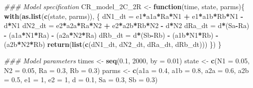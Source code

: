 \documentclass[
]{book}
\newenvironment{Shaded}{\begin{snugshade}}{\end{snugshade}}
\newcommand{\CommentTok}[1]{\textcolor[rgb]{0.56,0.35,0.01}{\textit{#1}}}
\newcommand{\ControlFlowTok}[1]{\textcolor[rgb]{0.13,0.29,0.53}{\textbf{#1}}}
\newcommand{\DataTypeTok}[1]{\textcolor[rgb]{0.13,0.29,0.53}{#1}}
\newcommand{\DecValTok}[1]{\textcolor[rgb]{0.00,0.00,0.81}{#1}}
\newcommand{\FloatTok}[1]{\textcolor[rgb]{0.00,0.00,0.81}{#1}}
\newcommand{\KeywordTok}[1]{\textcolor[rgb]{0.13,0.29,0.53}{\textbf{#1}}}
\newcommand{\NormalTok}[1]{#1}
\newcommand{\OperatorTok}[1]{\textcolor[rgb]{0.81,0.36,0.00}{\textbf{#1}}}
\newcommand{\StringTok}[1]{\textcolor[rgb]{0.31,0.60,0.02}{#1}}
\begin{document}
\begin{Shaded}
\begin{Highlighting}[]
\CommentTok{### Model specification}
\NormalTok{CR_model_2C_2R <-}\StringTok{ }\ControlFlowTok{function}\NormalTok{(time, state, parms)\{}
  \KeywordTok{with}\NormalTok{(}\KeywordTok{as.list}\NormalTok{(}\KeywordTok{c}\NormalTok{(state, parms)), \{}
\NormalTok{    dN1_dt =}\StringTok{ }\NormalTok{e1}\OperatorTok{*}\NormalTok{a1a}\OperatorTok{*}\NormalTok{Ra}\OperatorTok{*}\NormalTok{N1 }\OperatorTok{+}\StringTok{ }\NormalTok{e1}\OperatorTok{*}\NormalTok{a1b}\OperatorTok{*}\NormalTok{Rb}\OperatorTok{*}\NormalTok{N1 }\OperatorTok{-}\StringTok{ }\NormalTok{d}\OperatorTok{*}\NormalTok{N1}
\NormalTok{    dN2_dt =}\StringTok{ }\NormalTok{e2}\OperatorTok{*}\NormalTok{a2a}\OperatorTok{*}\NormalTok{Ra}\OperatorTok{*}\NormalTok{N2 }\OperatorTok{+}\StringTok{ }\NormalTok{e2}\OperatorTok{*}\NormalTok{a2b}\OperatorTok{*}\NormalTok{Rb}\OperatorTok{*}\NormalTok{N2 }\OperatorTok{-}\StringTok{ }\NormalTok{d}\OperatorTok{*}\NormalTok{N2}
\NormalTok{    dRa_dt =}\StringTok{ }\NormalTok{d}\OperatorTok{*}\NormalTok{(Sa}\OperatorTok{-}\NormalTok{Ra) }\OperatorTok{-}\StringTok{ }\NormalTok{(a1a}\OperatorTok{*}\NormalTok{N1}\OperatorTok{*}\NormalTok{Ra) }\OperatorTok{-}\StringTok{ }\NormalTok{(a2a}\OperatorTok{*}\NormalTok{N2}\OperatorTok{*}\NormalTok{Ra) }
\NormalTok{    dRb_dt =}\StringTok{ }\NormalTok{d}\OperatorTok{*}\NormalTok{(Sb}\OperatorTok{-}\NormalTok{Rb) }\OperatorTok{-}\StringTok{ }\NormalTok{(a1b}\OperatorTok{*}\NormalTok{N1}\OperatorTok{*}\NormalTok{Rb) }\OperatorTok{-}\StringTok{ }\NormalTok{(a2b}\OperatorTok{*}\NormalTok{N2}\OperatorTok{*}\NormalTok{Rb)}
    \KeywordTok{return}\NormalTok{(}\KeywordTok{list}\NormalTok{(}\KeywordTok{c}\NormalTok{(dN1_dt, dN2_dt, dRa_dt, dRb_dt)))}
\NormalTok{  \})}
\NormalTok{\}}

\CommentTok{### Model parameters}
\NormalTok{times <-}\StringTok{ }\KeywordTok{seq}\NormalTok{(}\FloatTok{0.1}\NormalTok{, }\DecValTok{2000}\NormalTok{, }\DataTypeTok{by =} \FloatTok{0.01}\NormalTok{)}
\NormalTok{state <-}\StringTok{ }\KeywordTok{c}\NormalTok{(}\DataTypeTok{N1 =} \FloatTok{0.05}\NormalTok{, }\DataTypeTok{N2 =} \FloatTok{0.05}\NormalTok{, }\DataTypeTok{Ra =} \FloatTok{0.3}\NormalTok{, }\DataTypeTok{Rb =} \FloatTok{0.3}\NormalTok{)}
\NormalTok{parms <-}\StringTok{ }\KeywordTok{c}\NormalTok{(}\DataTypeTok{a1a =} \FloatTok{0.4}\NormalTok{, }\DataTypeTok{a1b =} \FloatTok{0.8}\NormalTok{, }\DataTypeTok{a2a =} \FloatTok{0.6}\NormalTok{, }\DataTypeTok{a2b =} \FloatTok{0.5}\NormalTok{, }\DataTypeTok{e1 =} \DecValTok{1}\NormalTok{, }\DataTypeTok{e2 =} \DecValTok{1}\NormalTok{, }\DataTypeTok{d =} \FloatTok{0.1}\NormalTok{, }\DataTypeTok{Sa =} \FloatTok{0.3}\NormalTok{, }\DataTypeTok{Sb =} \FloatTok{0.3}\NormalTok{)  }


\end{Highlighting}
\end{Shaded}
\end{document}
